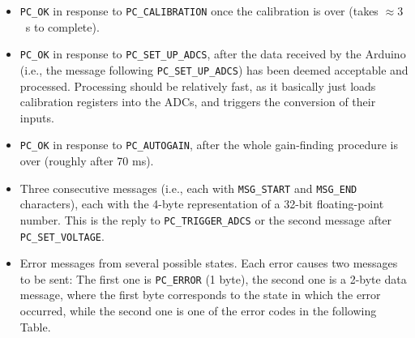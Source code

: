 \documentclass[11pt,a4paper,english]{article}
\begin{document}
\begin{itemize}
\item \texttt{PC\_OK} in response to \texttt{PC\_CALIBRATION} once the calibration is over (takes $\approx3$~s to complete).
\item \texttt{PC\_OK} in response to \texttt{PC\_SET\_UP\_ADCS}, after the data received by the Arduino (i.e., the message following \texttt{PC\_SET\_UP\_ADCS}) has been deemed acceptable and processed. Processing should be relatively fast, as it basically just loads calibration registers into the ADCs, and triggers the conversion of their inputs.
\item \texttt{PC\_OK} in response to \texttt{PC\_AUTOGAIN}, after the whole gain-finding procedure is over (roughly after 70 ms).
\item Three consecutive messages (i.e., each with \texttt{MSG\_START} and \texttt{MSG\_END} characters), each with the 4-byte representation of a 32-bit floating-point number. This is the reply to \texttt{PC\_TRIGGER\_ADCS} or the second message after \texttt{PC\_SET\_VOLTAGE}.
\item Error messages from several possible states. Each error causes two messages to be sent: The first one is \texttt{PC\_ERROR} (1 byte), the second one is a 2-byte data message, where the first byte corresponds to the state in which the error occurred, while the second one is one of the error codes in the following Table.


\end{itemize}
\end{document}
